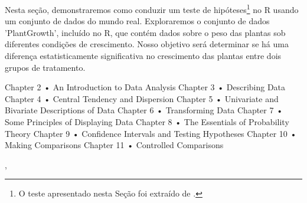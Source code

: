 \documentclass[article]{memoir}
\begin{document}
Nesta seção, demonstraremos como conduzir um teste de hipóteses\footnote{O teste  apresentado nesta Seção foi extraído de \cite{numberaroundus}.} no R usando um conjunto de dados do mundo real. Exploraremos o conjunto de dados 'PlantGrowth', incluído no R, que contém dados sobre o peso das plantas sob diferentes condições de crescimento. Nosso objetivo será determinar se há uma diferença estatisticamente significativa no crescimento das plantas entre dois grupos de tratamento.





Chapter 2 • An Introduction to Data Analysis
Chapter 3 • Describing Data
Chapter 4 • Central Tendency and Dispersion
Chapter 5 • Univariate and Bivariate Descriptions of Data
Chapter 6 • Transforming Data
Chapter 7 • Some Principles of Displaying Data
Chapter 8 • The Essentials of Probability Theory
Chapter 9 • Confidence Intervals and Testing Hypotheses
Chapter 10 • Making Comparisons
Chapter 11 • Controlled Comparisons

\newpage, 
\thispagestyle{plain}
\printpagenotes


\thispagestyle{plain}
\end{document}
